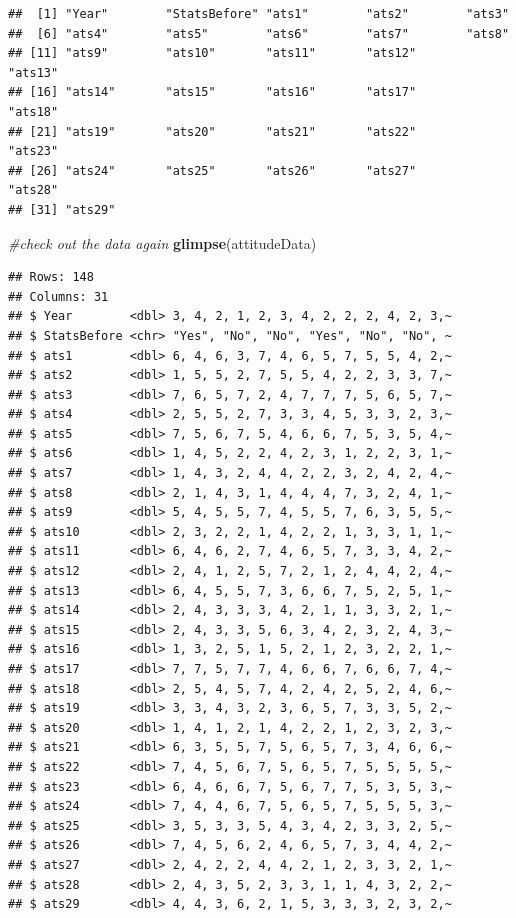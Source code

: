 \documentclass[
  12pt,
]{book}
\newenvironment{Shaded}{\begin{snugshade}}{\end{snugshade}}
\newcommand{\CommentTok}[1]{\textcolor[rgb]{0.56,0.35,0.01}{\textit{#1}}}
\newcommand{\FunctionTok}[1]{\textcolor[rgb]{0.13,0.29,0.53}{\textbf{#1}}}
\newcommand{\NormalTok}[1]{#1}
\begin{document}
\begin{verbatim}
##  [1] "Year"        "StatsBefore" "ats1"        "ats2"        "ats3"       
##  [6] "ats4"        "ats5"        "ats6"        "ats7"        "ats8"       
## [11] "ats9"        "ats10"       "ats11"       "ats12"       "ats13"      
## [16] "ats14"       "ats15"       "ats16"       "ats17"       "ats18"      
## [21] "ats19"       "ats20"       "ats21"       "ats22"       "ats23"      
## [26] "ats24"       "ats25"       "ats26"       "ats27"       "ats28"      
## [31] "ats29"
\end{verbatim}

\begin{Shaded}
\begin{Highlighting}[]
\CommentTok{\#check out the data again}
\FunctionTok{glimpse}\NormalTok{(attitudeData)}
\end{Highlighting}
\end{Shaded}

\begin{verbatim}
## Rows: 148
## Columns: 31
## $ Year        <dbl> 3, 4, 2, 1, 2, 3, 4, 2, 2, 2, 4, 2, 3,~
## $ StatsBefore <chr> "Yes", "No", "No", "Yes", "No", "No", ~
## $ ats1        <dbl> 6, 4, 6, 3, 7, 4, 6, 5, 7, 5, 5, 4, 2,~
## $ ats2        <dbl> 1, 5, 5, 2, 7, 5, 5, 4, 2, 2, 3, 3, 7,~
## $ ats3        <dbl> 7, 6, 5, 7, 2, 4, 7, 7, 7, 5, 6, 5, 7,~
## $ ats4        <dbl> 2, 5, 5, 2, 7, 3, 3, 4, 5, 3, 3, 2, 3,~
## $ ats5        <dbl> 7, 5, 6, 7, 5, 4, 6, 6, 7, 5, 3, 5, 4,~
## $ ats6        <dbl> 1, 4, 5, 2, 2, 4, 2, 3, 1, 2, 2, 3, 1,~
## $ ats7        <dbl> 1, 4, 3, 2, 4, 4, 2, 2, 3, 2, 4, 2, 4,~
## $ ats8        <dbl> 2, 1, 4, 3, 1, 4, 4, 4, 7, 3, 2, 4, 1,~
## $ ats9        <dbl> 5, 4, 5, 5, 7, 4, 5, 5, 7, 6, 3, 5, 5,~
## $ ats10       <dbl> 2, 3, 2, 2, 1, 4, 2, 2, 1, 3, 3, 1, 1,~
## $ ats11       <dbl> 6, 4, 6, 2, 7, 4, 6, 5, 7, 3, 3, 4, 2,~
## $ ats12       <dbl> 2, 4, 1, 2, 5, 7, 2, 1, 2, 4, 4, 2, 4,~
## $ ats13       <dbl> 6, 4, 5, 5, 7, 3, 6, 6, 7, 5, 2, 5, 1,~
## $ ats14       <dbl> 2, 4, 3, 3, 3, 4, 2, 1, 1, 3, 3, 2, 1,~
## $ ats15       <dbl> 2, 4, 3, 3, 5, 6, 3, 4, 2, 3, 2, 4, 3,~
## $ ats16       <dbl> 1, 3, 2, 5, 1, 5, 2, 1, 2, 3, 2, 2, 1,~
## $ ats17       <dbl> 7, 7, 5, 7, 7, 4, 6, 6, 7, 6, 6, 7, 4,~
## $ ats18       <dbl> 2, 5, 4, 5, 7, 4, 2, 4, 2, 5, 2, 4, 6,~
## $ ats19       <dbl> 3, 3, 4, 3, 2, 3, 6, 5, 7, 3, 3, 5, 2,~
## $ ats20       <dbl> 1, 4, 1, 2, 1, 4, 2, 2, 1, 2, 3, 2, 3,~
## $ ats21       <dbl> 6, 3, 5, 5, 7, 5, 6, 5, 7, 3, 4, 6, 6,~
## $ ats22       <dbl> 7, 4, 5, 6, 7, 5, 6, 5, 7, 5, 5, 5, 5,~
## $ ats23       <dbl> 6, 4, 6, 6, 7, 5, 6, 7, 7, 5, 3, 5, 3,~
## $ ats24       <dbl> 7, 4, 4, 6, 7, 5, 6, 5, 7, 5, 5, 5, 3,~
## $ ats25       <dbl> 3, 5, 3, 3, 5, 4, 3, 4, 2, 3, 3, 2, 5,~
## $ ats26       <dbl> 7, 4, 5, 6, 2, 4, 6, 5, 7, 3, 4, 4, 2,~
## $ ats27       <dbl> 2, 4, 2, 2, 4, 4, 2, 1, 2, 3, 3, 2, 1,~
## $ ats28       <dbl> 2, 4, 3, 5, 2, 3, 3, 1, 1, 4, 3, 2, 2,~
## $ ats29       <dbl> 4, 4, 3, 6, 2, 1, 5, 3, 3, 3, 2, 3, 2,~
\end{verbatim}
\end{document}
